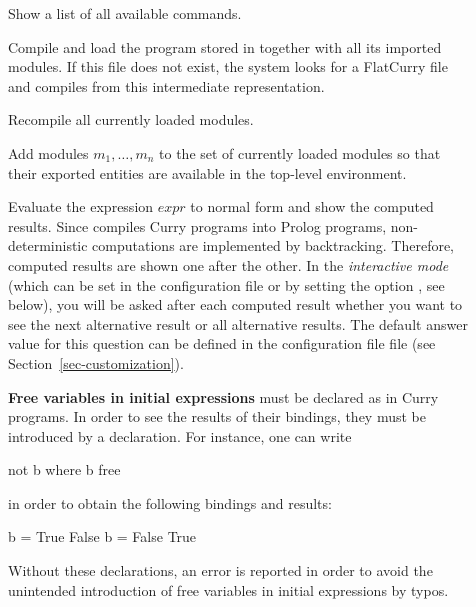 \begin{description}
\item[]
Show a list of all available commands.

\item[]
Compile and load the program stored in 
together with all its imported modules.
If this file does not exist, the system looks for a FlatCurry
file  and compiles from this intermediate representation.

\item[]
Recompile all currently loaded modules.

\item[]
Add modules $m_1,\ldots,m_n$ to the set of currently loaded modules
so that their exported entities are available in the top-level environment.

\item[] Evaluate the expression $expr$ to normal form
and show the computed results. Since \CYS
compiles Curry programs into Prolog programs,
non-deterministic computations are implemented by backtracking.
Therefore, computed results are shown one after the other.
In the \emph{interactive mode} (which can be set in the
configuration file \ccode{\curryrc} or by setting the option
, see below), you will be asked
after each computed result whether
you want to see the next alternative result or all alternative results.
The default answer value for this question can be defined
in the configuration file \ccode{\curryrc} file
(see Section~\ref{sec-customization}).

\textbf{Free variables in initial expressions} must be declared as
in Curry programs.
In order to see the results of their bindings,
they must be introduced by a  declaration.
For instance, one can write
\begin{curry}
not b where b free
\end{curry}
in order to obtain the following bindings and results:
\begin{curry}
{b = True} False
{b = False} True
\end{curry}
Without these declarations, an error is reported in order to
avoid the unintended introduction of free variables in initial expressions
by typos.


\end{description}
